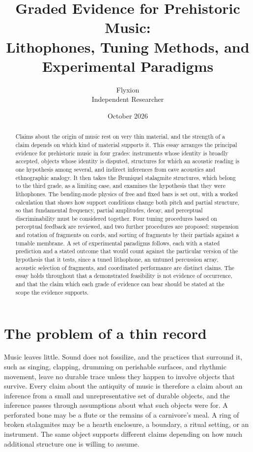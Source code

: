 \documentclass[12pt]{article}
\title{Graded Evidence for Prehistoric Music:\\Lithophones, Tuning Methods, and Experimental Paradigms}
\author{Flyxion\\Independent Researcher}
\date{October 2026}
\begin{document}
\maketitle

\begin{abstract}
\noindent Claims about the origin of music rest on very thin material, and the strength of a claim depends on which kind of material supports it. This essay arranges the principal evidence for prehistoric music in four grades: instruments whose identity is broadly accepted, objects whose identity is disputed, structures for which an acoustic reading is one hypothesis among several, and indirect inferences from cave acoustics and ethnographic analogy. It then takes the Bruniquel stalagmite structures, which belong to the third grade, as a limiting case, and examines the hypothesis that they were lithophones. The bending-mode physics of free and fixed bars is set out, with a worked calculation that shows how support conditions change both pitch and partial structure, so that fundamental frequency, partial amplitudes, decay, and perceptual discriminability must be considered together. Four tuning procedures based on perceptual feedback are reviewed, and two further procedures are proposed: suspension and rotation of fragments on cords, and sorting of fragments by their partials against a tunable membrane. A set of experimental paradigms follows, each with a stated prediction and a stated outcome that would count against the particular version of the hypothesis that it tests, since a tuned lithophone, an untuned percussion array, acoustic selection of fragments, and coordinated performance are distinct claims. The essay holds throughout that a demonstrated feasibility is not evidence of occurrence, and that the claim which each grade of evidence can bear should be stated at the scope the evidence supports.
\end{abstract}

\section{The problem of a thin record}

Music leaves little. Sound does not fossilize, and the practices that surround it, such as singing, clapping, drumming on perishable surfaces, and rhythmic movement, leave no durable trace unless they happen to involve objects that survive. Every claim about the antiquity of music is therefore a claim about an inference from a small and unrepresentative set of durable objects, and the inference passes through assumptions about what such objects were for. A perforated bone may be a flute or the remains of a carnivore's meal. A ring of broken stalagmites may be a hearth enclosure, a boundary, a ritual setting, or an instrument. The same object supports different claims depending on how much additional structure one is willing to assume.
\end{document}
